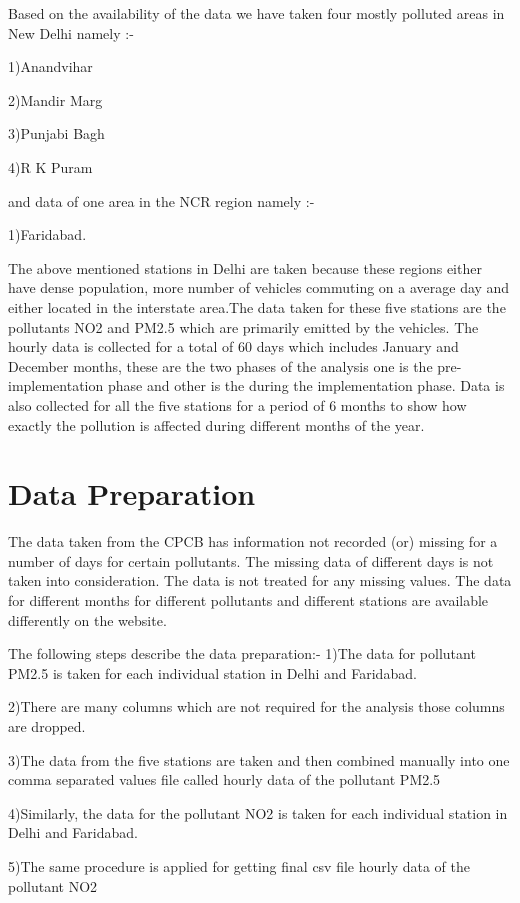 \documentclass{report}
\begin{document}
Based on the availability of the data we have taken four mostly polluted areas in New Delhi namely :-

1)Anandvihar

2)Mandir Marg

3)Punjabi Bagh 

4)R K Puram 

and data of one area in the NCR region namely :-

1)Faridabad.

The above mentioned stations in Delhi are taken because these regions either have dense population, more number of vehicles commuting on a average day and either located  in the interstate area.The data taken for these five stations are the pollutants NO2 and PM2.5 which are primarily emitted by the vehicles. The hourly data is collected for a total of 60 days which includes January and December months, these are the two phases of the analysis one is the pre-implementation phase and other is the during the implementation phase. Data is also collected for all the five stations for a period of 6 months to show how exactly the pollution is affected during different months of the year. 
 

\section{Data Preparation}
The data taken from the CPCB has information not recorded (or) missing for a number of days for certain pollutants. The missing data of different days is not taken into consideration.  The data is not treated for any missing values. The data for different months for different pollutants and different stations are available differently on the website.

The following steps describe the data preparation:-
1)The data for pollutant PM2.5 is taken for each individual station in Delhi and Faridabad.

2)There are many columns which are not required for the analysis those columns are dropped. 

3)The data from the five stations are taken and then combined manually into one comma separated values file called  hourly data of the pollutant PM2.5 


4)Similarly, the data for the pollutant NO2 is taken for each individual station in Delhi and Faridabad. 

5)The same procedure is applied for getting final csv file hourly data of the pollutant NO2 
\end{document}
